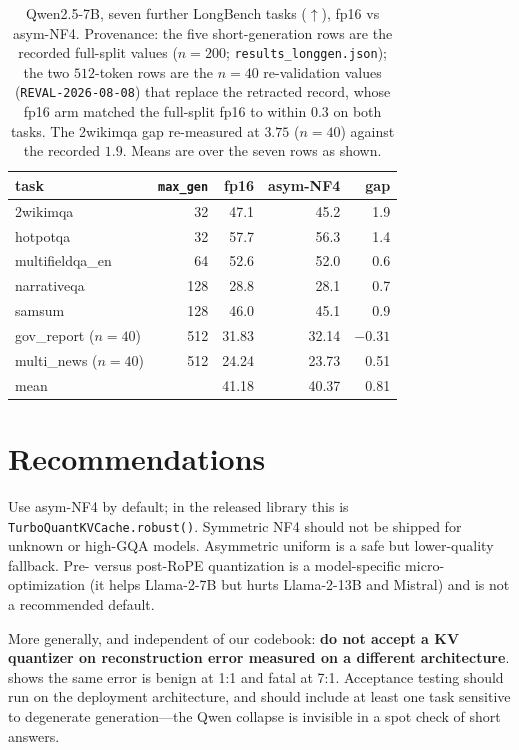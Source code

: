 \documentclass{article}
\theoremstyle{plain}
\theoremstyle{definition}
\begin{document}
\begin{table}[t]
\centering\small
\caption{Qwen2.5-7B, seven further LongBench tasks ($\uparrow$), fp16 vs asym-NF4. Provenance:
the five short-generation rows are the recorded full-split values ($n{=}200$;
\texttt{results\_longgen.json}); the two $512$-token rows are the $n{=}40$ re-validation
values (\texttt{REVAL-2026-08-08}) that replace the retracted record, whose fp16 arm matched
the full-split fp16 to within $0.3$ on both tasks. The 2wikimqa gap re-measured at $3.75$
($n{=}40$) against the recorded $1.9$. Means are over the seven rows as shown.}
\label{tab:breadth}
\begin{tabular}{lrrrr}
\toprule
task & \texttt{max\_gen} & fp16 & asym-NF4 & gap \\
\midrule
2wikimqa            & 32  & 47.1  & 45.2  & 1.9 \\
hotpotqa            & 32  & 57.7  & 56.3  & 1.4 \\
multifieldqa\_en    & 64  & 52.6  & 52.0  & 0.6 \\
narrativeqa         & 128 & 28.8  & 28.1  & 0.7 \\
samsum              & 128 & 46.0  & 45.1  & 0.9 \\
gov\_report ($n{=}40$) & 512 & 31.83 & 32.14 & $-0.31$ \\
multi\_news ($n{=}40$) & 512 & 24.24 & 23.73 & 0.51 \\
\midrule
mean                &     & 41.18 & 40.37 & 0.81 \\
\bottomrule
\end{tabular}
\end{table}

\section{Recommendations}
\label{sec:reco}
Use asym-NF4 by default; in the released library this is
\texttt{TurboQuantKVCache.robust()}. Symmetric NF4 should not be shipped for unknown or
high-GQA models. Asymmetric uniform is a safe but lower-quality fallback. Pre- versus post-RoPE
quantization is a model-specific micro-optimization (it helps Llama-2-7B but hurts Llama-2-13B
and Mistral) and is not a recommended default.

More generally, and independent of our codebook: \textbf{do not accept a KV quantizer on
reconstruction error measured on a different architecture}.  shows the same
error is benign at 1:1 and fatal at 7:1. Acceptance testing should run on the deployment
architecture, and should include at least one task sensitive to degenerate generation---the
Qwen collapse is invisible in a spot check of short answers.
\end{document}
